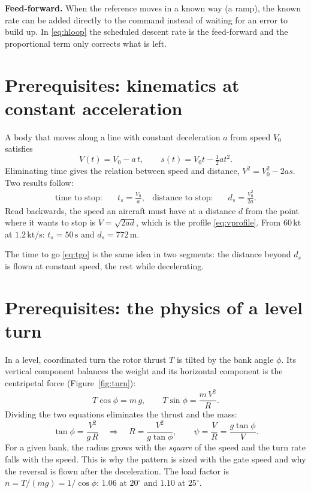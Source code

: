 \documentclass[11pt,a4paper]{article}
\newcommand{\un}[1]{\,\mathrm{#1}}
\begin{document}
\textbf{Feed-forward.} When the reference moves in a known way (a ramp), the
known rate can be added directly to the command instead of waiting for an
error to build up. In \eqref{eq:hloop} the scheduled descent rate is the
feed-forward and the proportional term only corrects what is left.

\section{Prerequisites: kinematics at constant acceleration}\label{app:kin}

A body that moves along a line with constant deceleration $a$ from speed
$V_0$ satisfies
\[
V(t)=V_0-a\,t,\qquad s(t)=V_0t-\tfrac12at^2 .
\]
Eliminating time gives the relation between speed and distance,
$V^2=V_0^2-2as$. Two results follow:
\begin{align}
\text{time to stop:}\quad & t_s = \frac{V_0}{a}, &
\text{distance to stop:}\quad & d_s=\frac{V_0^2}{2a}.
\end{align}
Read backwards, the speed an aircraft must have at a distance $d$ from the
point where it wants to stop is $V=\sqrt{2ad}$, which is the profile
\eqref{eq:vprofile}. From $60\un{kt}$ at $1.2\un{kt/s}$: $t_s=50\un{s}$ and
$d_s=772\un{m}$.

The time to go \eqref{eq:tgo} is the same idea in two segments: the distance
beyond $d_s$ is flown at constant speed, the rest while decelerating.

\section{Prerequisites: the physics of a level turn}\label{app:turn}

In a level, coordinated turn the rotor thrust $T$ is tilted by the bank angle
$\phi$. Its vertical component balances the weight and its horizontal
component is the centripetal force (Figure~\ref{fig:turn}):
\begin{equation}
T\cos\phi = m\,g,\qquad T\sin\phi = \frac{m\,V^2}{R} .
\end{equation}
Dividing the two equations eliminates the thrust and the mass:
\begin{equation}
\tan\phi=\frac{V^2}{g\,R}
\quad\Longrightarrow\quad
R=\frac{V^2}{g\tan\phi},\qquad
\dot\psi=\frac{V}{R}=\frac{g\tan\phi}{V}. \label{eq:turn}
\end{equation}
For a given bank, the radius grows with the \emph{square} of the speed and the
turn rate falls with the speed. This is why the pattern is sized with the gate
speed and why the reversal is flown after the deceleration. The load factor is
$n=T/(mg)=1/\cos\phi$: $1.06$ at $20^\circ$ and $1.10$ at $25^\circ$.
\end{document}
